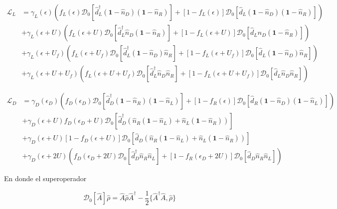 \begin{align*}
    \mathcal{L}_{L} & = \gamma_{L}(\epsilon)(f_{L}(\epsilon)\mathcal{D}_{0}[\hat{d}^{\dagger}_{L}(\textbf{1}-\hat{n}_{D})(\textbf{1}-\hat{n}_{R}) ]  + [1-f_{L}(\epsilon)]\mathcal{D}_{0}[\hat{d}_{L}(\textbf{1}-\hat{n}_{D})(\textbf{1}-\hat{n}_{R}) ]  )  \\
                    & + \gamma_{L}(\epsilon+U)(f_{L}(\epsilon+U)\mathcal{D}_{0}[\hat{d}^{\dagger}_{L}\hat{n}_{D}(\textbf{1}-\hat{n}_{R}) ]  + [1-f_{L}(\epsilon+U)]\mathcal{D}_{0}[\hat{d}_{L}\hat{n}_{D}(\textbf{1}-\hat{n}_{R}) ]  ) \\
                   & + \gamma_{L}(\epsilon+U_{f})(f_{L}(\epsilon+U_{f})\mathcal{D}_{0}[\hat{d}^{\dagger}_{L}(\textbf{1}-\hat{n}_{D})\hat{n}_{R} ]  + [1-f_{L}(\epsilon+U_{f})]\mathcal{D}_{0}[\hat{d}_{L}(\textbf{1}-\hat{n}_{D})\hat{n}_{R} ]  ) \\
                  & + \gamma_{L}(\epsilon+U+U_{f})(f_{L}(\epsilon+U+U_{f})\mathcal{D}_{0}[\hat{d}^{\dagger}_{L}\hat{n}_{D}\hat{n}_{R} ]  + [1-f_{L}(\epsilon+U+U_{f})]\mathcal{D}_{0}[\hat{d}_{L}\hat{n}_{D}\hat{n}_{R} ]  ) 
\end{align*}

\begin{align*}
    \mathcal{L}_{D} & = \gamma_{D}(\epsilon_{D})(f_{D}(\epsilon_{D})\mathcal{D}_{0}[\hat{d}^{\dagger}_{D}(\textbf{1}-\hat{n}_{R})(\textbf{1}-\hat{n}_{L}) ]  + [1-f_{R}(\epsilon)]\mathcal{D}_{0}[\hat{d}_{R}(\textbf{1}-\hat{n}_{D})(\textbf{1}-\hat{n}_{L}) ]  )  \\
                    & + \gamma_{D}(\epsilon+U)f_{D}(\epsilon_{D}+U)\mathcal{D}_{0}[\hat{d}^{\dagger}_{D}(\hat{n}_{R}(\textbf{1}-\hat{n}_{L}) + \hat{n}_{L}(\textbf{1}-\hat{n}_{R})) ]  \\
                    & + \gamma_{D}(\epsilon+U)[1-f_{D}(\epsilon+U)]\mathcal{D}_{0}[\hat{d}_{D}(\hat{n}_{R}(\textbf{1}-\hat{n}_{L}) + \hat{n}_{L}(\textbf{1}-\hat{n}_{R}))]   \\
                   & + \gamma_{D}(\epsilon+2U)(f_{D}(\epsilon_{D}+2U)\mathcal{D}_{0}[\hat{d}^{\dagger}_{D}\hat{n}_{R}\hat{n}_{L} ]  + [1-f_{R}(\epsilon_{D}+2U)]\mathcal{D}_{0}[\hat{d}_{D}\hat{n}_{R}\hat{n}_{L} ]  )    
\end{align*}

En donde el superoperador 

\begin{equation*}
    \mathcal{D}_{0}[\hat{A}]\hat{\rho} = \hat{A}\hat{\rho}\hat{A}^{\dagger}- \frac{1}{2} \{\hat{A }^{\dagger}\hat{A},\hat{\rho} \}
\end{equation*}

